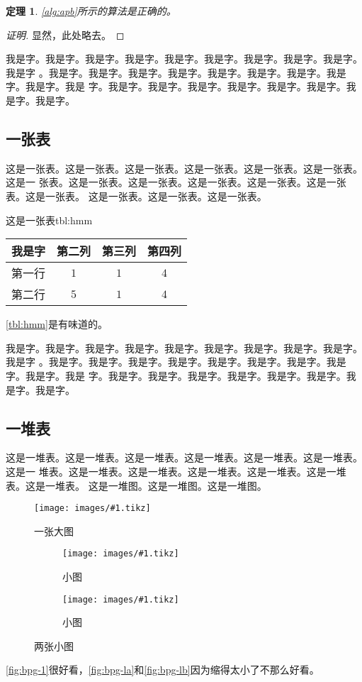 \documentclass[supercite]{HustGraduPaper}
\newcommand{\cfig}[3]{
  \begin{figure}[htb]
    \centering
    \texttt{[image: images/\#1.tikz]}
    \caption{#3}
    \label{fig:#1}
  \end{figure}
}
\newcommand{\sfig}[3]{
  \begin{subfigure}[b]{#2\textwidth}
    \texttt{[image: images/\#1.tikz]}
    \caption{#3}
    \label{fig:#1}
  \end{subfigure}
}
\newcommand{\xfig}[3]{
  \begin{figure}[htb]
    \centering
    #3
    \caption{#2}
    \label{fig:#1}
  \end{figure}
}
\newcommand{\rfig}[1]{\autoref{fig:#1}}
\newcommand{\ralg}[1]{\autoref{alg:#1}}
\newcommand{\rtbl}[1]{\autoref{tbl:#1}}
\newtheorem{thm}{定理}[section]
\theoremstyle{definition}
\begin{document}
\begin{thm} \label{thm:gsb-apprx}
  \ralg{apb}所示的算法是正确的。
\end{thm}
\begin{proof}[证明]
  显然，此处略去。
\end{proof}

我是字。我是字。我是字。我是字。我是字。我是字。我是字。我是字。我是字。我是字
。我是字。我是字。我是字。我是字。我是字。我是字。我是字。我是字。我是字。我是
字。我是字。我是字。我是字。我是字。我是字。我是字。我是字。我是字。

\subsection{一张表}

这是一张表。这是一张表。这是一张表。这是一张表。这是一张表。这是一张表。这是一
张表。这是一张表。这是一张表。这是一张表。这是一张表。这是一张表。这是一张表。
这是一张表。这是一张表。这是一张表。

\begin{generaltab}{这是一张表}{tbl:hmm}
  \begin{tabular}{c|ccc}
    \toprule
    我是字 & 第二列 & 第三列 & 第四列 \\
    \midrule
    第一行 & $1$ & $1$ & $4$ \\
    第二行 & $5$ & $1$ & $4$ \\
    \bottomrule
  \end{tabular}
\end{generaltab}

\rtbl{hmm}是有味道的。

我是字。我是字。我是字。我是字。我是字。我是字。我是字。我是字。我是字。我是字
。我是字。我是字。我是字。我是字。我是字。我是字。我是字。我是字。我是字。我是
字。我是字。我是字。我是字。我是字。我是字。我是字。我是字。我是字。

\subsection{一堆表}

这是一堆表。这是一堆表。这是一堆表。这是一堆表。这是一堆表。这是一堆表。这是一
堆表。这是一堆表。这是一堆表。这是一堆表。这是一堆表。这是一堆表。这是一堆表。
这是一堆图。这是一堆图。这是一堆图。

\cfig{bpg-1}{0.8}{一张大图}

\xfig{bpg-l}{两张小图}{
  \sfig{bpg-la}{0.3}{小图}
  \sfig{bpg-lb}{0.3}{小图}
}

\rfig{bpg-1}很好看，\rfig{bpg-la}和\rfig{bpg-lb}因为缩得太小了不那么好看。
\end{document}
